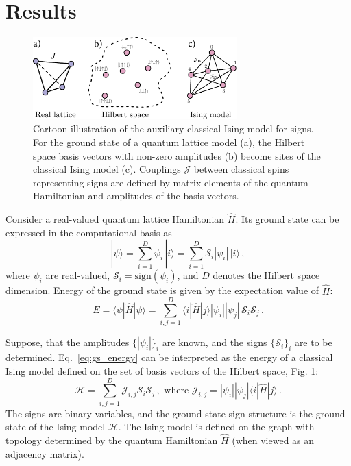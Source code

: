 \section{Results}\label{sec:Ising}

\begin{figure}[t!]
    \centering
    \includegraphics[width=0.7\textwidth]{handmade/cartoon_ising.pdf}
	\caption{\label{fig:sign_ising}Cartoon illustration of the auxiliary classical Ising model for signs. For the ground state of a quantum lattice model (a), the Hilbert space basis vectors with non-zero amplitudes (b) become sites of the classical Ising model (c). Couplings $\mathcal{J}$ between classical spins representing signs are defined by matrix elements of the quantum Hamiltonian and amplitudes of the basis vectors.}
\end{figure}

Consider a real-valued quantum lattice Hamiltonian $\hat{H}$.  Its ground state can be expressed in the computational basis as
\begin{equation}
|\psi \rangle = \sum\limits_{i=1}^D \psi_i \, |i\rangle = \sum\limits_{i=1}^D \mathcal{S}_i |\psi_i| \,| i \rangle \,,
\label{eq:quantum_gs}
\end{equation}
where $\psi_i$ are real-valued, $\mathcal{S}_i = \mathrm{sign}(\psi_i)$, and $D$ denotes the Hilbert space dimension. Energy of the ground state is given by the expectation value of $\hat{H}$:
\begin{equation}
    E = \langle \psi | \hat{H} | \psi \rangle = \sum\limits_{i,j = 1}^{D} \langle i | \hat{H} | j \rangle |\psi_i| |\psi_j| \, \mathcal{S}_i \mathcal{S}_j \,. \label{eq:gs_energy}
\end{equation}

Suppose, that the amplitudes $\{|\psi_i|\}_i$ are known, and the signs $\{\mathcal{S}_i\}_i$ are to be determined. Eq.~\eqref{eq:gs_energy} can be interpreted as the energy of a classical Ising model defined on the set of basis vectors of the Hilbert space, Fig. \ref{fig:sign_ising}:
\begin{equation}
    \mathcal{H} = \sum\limits_{i,j = 1}^D \mathcal{J}_{i,j} \mathcal{S}_i \mathcal{S}_j\,, \text{ where } \mathcal{J}_{i,j} = |\psi_i||\psi_j| \langle i | \hat{H} | j \rangle \,. \label{eq:Ising}
\end{equation}
The signs are binary variables, and the ground state sign structure is the ground state of the Ising model $\mathcal{H}$. The Ising model is defined on the graph with topology determined by the quantum Hamiltonian $\hat{H}$ (when viewed as an adjacency matrix).

